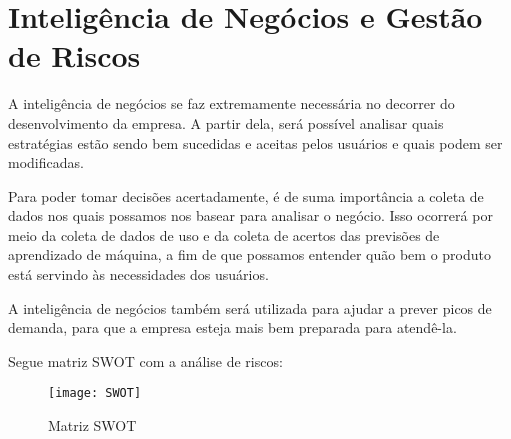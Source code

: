 \section{Inteligência de Negócios e Gestão de Riscos}

A inteligência de negócios se faz extremamente necessária no decorrer do desenvolvimento da empresa. A partir dela, será possível analisar quais estratégias estão sendo bem sucedidas e aceitas pelos usuários e quais podem ser modificadas.

Para poder tomar decisões acertadamente, é de suma importância a coleta de dados nos quais possamos nos basear para analisar o negócio. Isso ocorrerá por meio da coleta de dados de uso e da coleta de acertos das previsões de aprendizado de máquina, a fim de que possamos entender quão bem o produto está servindo às necessidades dos usuários.

A inteligência de negócios também será utilizada para ajudar a prever picos de demanda, para que a empresa esteja mais bem preparada para atendê-la.

Segue matriz SWOT com a análise de riscos:

\begin{figure}[htb]
	\caption{\label{fig:SWOT}Matriz SWOT}
	\begin{center}
		\texttt{[image: SWOT]}
	\end{center}
\end{figure}

